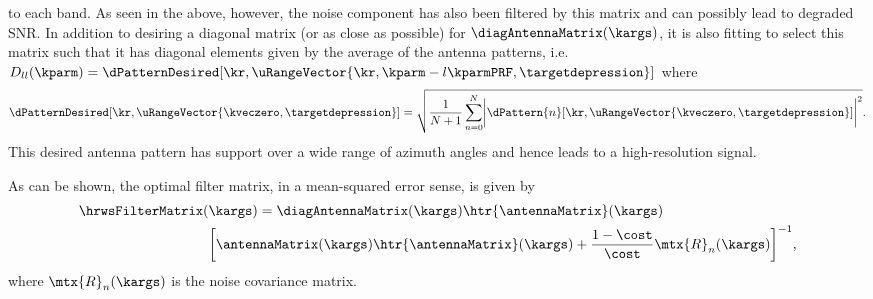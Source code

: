 to each band. As seen in the above, however, the noise component has also been filtered by this matrix and can possibly lead to degraded SNR. In addition to desiring a diagonal matrix (or as close as possible) for $\diagAntennaMatrix(\kargs)$, it is also fitting to select this matrix such that it has diagonal elements given by the average of the antenna patterns, i.e. $D_{ll}(\kparm) = \dPatternDesired[\kr,\uRangeVector{\kr, \kparm-l\kparmPRF, \targetdepression}]$
where
\begin{equation}
 \dPatternDesired[\kr,\uRangeVector{\kveczero, \targetdepression}]=\sqrt{\frac{1}{N+1}\sum_{n=0}^{N}\biggl\lvert\dPattern{n}[\kr,\uRangeVector{\kveczero, \targetdepression}]\biggr\rvert^2}.
\end{equation}
This desired antenna pattern has support over a wide range of azimuth angles and hence leads to a high-resolution signal.
\par
As can be shown, the optimal filter matrix, in a mean-squared error sense, is given by
\begin{equation}
\begin{split}
 \hrwsFilterMatrix(&\kargs)=\diagAntennaMatrix(\kargs)\htr{\antennaMatrix}(\kargs)\\
 &\biggl[\antennaMatrix(\kargs)\htr{\antennaMatrix}(\kargs)+\frac{1-\cost}{\cost}\mtx{R}_n(\kargs)\biggr]^{-1},
\end{split}
\end{equation}
where $\mtx{R}_n(\kargs)$ is the noise covariance matrix.
